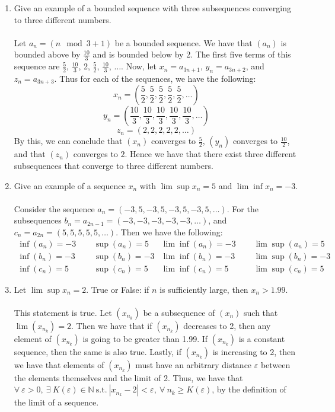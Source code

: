 \documentclass[12pt,letterpaper]{article}
\newcommand{\st}{\ \text{s.t.}\ }
\newcommand{\N}{\mathbb{N}}
\theoremstyle{case}
\theoremstyle{definition}
\begin{document}
\begin{enumerate}
\begin{enumerate}
		\item Give an example of a bounded sequence with three subsequences converging to three different numbers.
		\\\\Let $a_n=(n \mod 3 + 1)$ be a bounded sequence. We have that $(a_n)$ is bounded above by $\frac{10}{3}$ and is bounded below by 2. The first five terms of this sequence are $\frac{5}{2}$, $\frac{10}{3}$, 2, $\frac{5}{2}$, $\frac{10}{3}$, $\dots$. Now, let $x_n=a_{3n+1}$, $y_n=a_{3n+2}$, and $z_n=a_{3n+3}$. Thus for each of the sequences, we have the following:
		\[x_n=(\frac{5}{2}, \frac{5}{2}, \frac{5}{2}, \frac{5}{2}, \frac{5}{2}, \dots)\]
		\[y_n=(\frac{10}{3}, \frac{10}{3}, \frac{10}{3}, \frac{10}{3}, \frac{10}{3}, \dots)\]
		\[z_n=(2,2,2,2,2,\dots)\]
		By this, we can conclude that $(x_n)$ converges to $\frac{5}{2}$, $(y_n)$ converges to $\frac{10}{2}$, and that $(z_n)$ converges to $2$. Hence we have that there exist three different subsequences that converge to three different numbers. \\
		
		\item Give an example of a sequence $x_n$ with $\lim \sup x_n = 5$ and $\lim \inf x_n = -3$.
		\\\\Consider the sequence $a_n=(-3,5,-3,5,-3,5,-3,5,\dots)$. For the subsequences $b_n=a_{2n-1}=(-3,-3,-3,-3,-3,\dots)$, and $c_n=a_{2n}=(5,5,5,5,5,\dots)$. Then we have the following:
		\begin{align*}
			\inf (a_n)=-3\ \ \ \ \ \ &\sup (a_n)=5 &\lim \inf (a_n)=-3\ \ \ \ \ \ &\lim \sup (a_n)=5 \\
			\inf (b_n)=-3\ \ \ \ \ \ &\sup (b_n)=-3 &\lim \inf (b_n)=-3\ \ \ \ \ \ &\lim \sup (b_n)=-3 \\
			\inf (c_n)=5\ \ \ \ \ \ &\sup (c_n)=5 &\lim \inf (c_n)=5\ \ \ \ \ \ &\lim \sup (c_n)=5
		\end{align*}
		
		\item Let $\lim \sup x_n = 2$. True or False: if $n$ is sufficiently large, then $x_n > 1.99$.
		\\\\This statement is true. Let $(x_{n_k})$ be a subsequence of $(x_n)$ such that $\lim (x_{n_k})=2$. Then we have that if $(x_{n_k})$ decreases to 2, then any element of $(x_{n_k})$ is going to be greater than 1.99. If $(x_{n_k})$ is a constant sequence, then the same is also true. Lastly, if $(x_{n_k})$ is increasing to 2, then we have that elements of $(x_{n_k})$ must have an arbitrary distance $\varepsilon$ between the elements themselves and the limit of 2. Thus, we have that $\forall\ \varepsilon>0,\ \exists\ K(\varepsilon) \in \N \st |x_{n_k}-2|<\varepsilon,\ \forall\ n_k \geq K(\varepsilon)$, by the definition of the limit of a sequence. 
		

\end{enumerate}
\end{enumerate}
\end{document}
